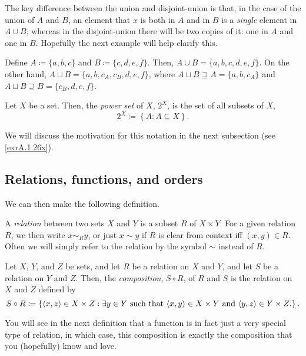 The key difference between the union and disjoint-union is that, in the case of the union of $A$ and $B$, an element that $x$ is both in $A$ and in $B$ is a \emph{single} element in $A\cup B$, whereas in the disjoint-union there will be two copies of it:  one in $A$ and one in $B$.  Hopefully the next example will help clarify this.
\begin{exm}
Define $A\coloneqq \{ a,b,c\}$ and $B\coloneqq \{ c,d,e,f\}$.  Then, $A\cup B=\{ a,b,c,d,e,f\}$.  On the other hand, $A\sqcup B=\{ a,b,c_A,c_B,d,e,f\}$, where $A\sqcup B\supseteq A=\{ a,b,c_A\}$ and $A\sqcup B\supseteq B=\{ c_B,d,e,f\}$.
\end{exm}
\begin{dfn}
Let $X$ be a set.  Then, the \emph{power set} of $X$, $2^X$, is the set of all subsets of $X$,
\begin{equation}
2^X\coloneqq \left\{ A:A\subseteq X\right\} .
\end{equation}
\begin{rmk}
We will discuss the motivation for this notation in the next subsection (see \cref{exrA.1.26x}).
\end{rmk}
\end{dfn}

\subsection{Relations, functions, and orders}

We can then make the following definition.
\begin{dfn}[Relation]
A \emph{relation} between two sets $X$ and $Y$ is a subset $R$ of $X\times Y$.  For a given relation $R$, we then write $x\sim _Ry$, or just $x\sim y$ if $R$ is clear from context iff $(x,y)\in R$.  Often we will simply refer to the relation by the symbol $\sim$ instead of $R$.
\end{dfn}
\begin{dfn}[Composition]\label{Composition}
Let $X$, $Y$, and $Z$ be sets, and let $R$ be a relation on $X$ and $Y$, and let $S$ be a relation on $Y$ and $Z$.  Then, the \emph{composition}, $S\circ R$, of $R$ and $S$ is the relation on $X$ and $Z$ defined by
\begin{equation}
S\circ R\coloneqq \left\{ \langle x,z\rangle\in X\times Z:\exists y\in Y\text{ such that }\langle x,y\rangle\in X\times Y\text{ and }\langle y,z\rangle\in Y\times Z\text{.}\right\} .
\end{equation}
\begin{rmk}
You will see in the next definition that a function is in fact just a very special type of relation, in which case, this composition is exactly the composition that you (hopefully) know and love.
\end{rmk}
\end{dfn}

